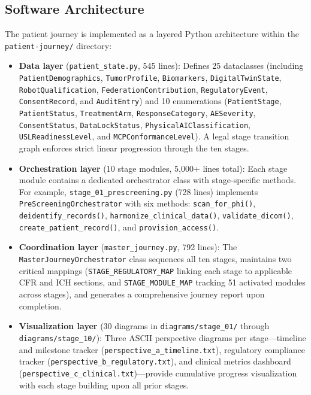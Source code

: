 \documentclass{article}
\begin{document}
\subsection{Software Architecture}
\label{sec:software-architecture}

The patient journey is implemented as a layered Python architecture within the \texttt{patient-journey/} directory:

\begin{itemize}[leftmargin=*]
\item \textbf{Data layer} (\texttt{patient\_state.py}, 545 lines): Defines 25 dataclasses (including \texttt{PatientDemographics}, \texttt{TumorProfile}, \texttt{Biomarkers}, \texttt{DigitalTwinState}, \texttt{RobotQualification}, \texttt{FederationContribution}, \texttt{RegulatoryEvent}, \texttt{ConsentRecord}, and \texttt{AuditEntry}) and 10 enumerations (\texttt{PatientStage}, \texttt{PatientStatus}, \texttt{TreatmentArm}, \texttt{ResponseCategory}, \texttt{AESeverity}, \texttt{ConsentStatus}, \texttt{DataLockStatus}, \texttt{PhysicalAIClassification}, \texttt{USLReadinessLevel}, and \texttt{MCPConformanceLevel}). A legal stage transition graph enforces strict linear progression through the ten stages.

\item \textbf{Orchestration layer} (10 stage modules, 5,000+ lines total): Each stage module contains a dedicated orchestrator class with stage-specific methods. For example, \texttt{stage\_01\_prescreening.py} (728 lines) implements \texttt{PreScreeningOrchestrator} with six methods: \texttt{scan\_for\_phi()}, \texttt{deidentify\_records()}, \texttt{harmonize\_clinical\_data()}, \texttt{validate\_dicom()}, \texttt{create\_patient\_record()}, and \texttt{provision\_access()}.

\item \textbf{Coordination layer} (\texttt{master\_journey.py}, 792 lines): The \texttt{MasterJourneyOrchestrator} class sequences all ten stages, maintains two critical mappings (\texttt{STAGE\_REGULATORY\_MAP} linking each stage to applicable CFR and ICH sections, and \texttt{STAGE\_MODULE\_MAP} tracking 51 activated modules across stages), and generates a comprehensive journey report upon completion.

\item \textbf{Visualization layer} (30 diagrams in \texttt{diagrams/stage\_01/} through \texttt{diagrams/stage\_10/}): Three ASCII perspective diagrams per stage---timeline and milestone tracker (\texttt{perspective\_a\_timeline.txt}), regulatory compliance tracker (\texttt{perspective\_b\_regulatory.txt}), and clinical metrics dashboard (\texttt{perspective\_c\_clinical.txt})---provide cumulative progress visualization with each stage building upon all prior stages.
\end{itemize}
\end{document}
